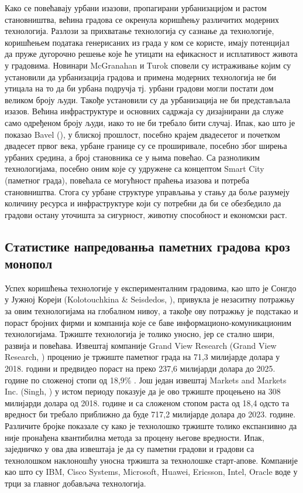 \documentclass{article}
\begin{document}
Како се повећавају урбани изазови, пропагирани урбанизацијом и растом становништва, већина градова се окренула коришћењу различитих модерних технологија. Разлози за прихватање технологија су сазнање да технологије, коришћењем података генерисаних из града у ком се користе, имају потенцијал да пруже дугорочно решење које ће утицати на ефикасност и исплативост живота у градовима. Новинари McGranahan и Тurok \cite{2013} сповели су истраживање којим су установили да урбанизација градова и примена модерних технологија не би утицала на то да би урбана подручја тј. урбани градови могли постати дом великом броју људи. Такође установили су да урбанизација не би представљала изазов. Већина инфраструктуре и основних садржаја су дизајнирани да служе само одређеном броју људи, иако то не би требало бити случај. Ипак, као што је показао Bavel (\cite{b_2013}), у блиској прошлост, посебно крајем двадесетог и почетком двадесет првог века, урбане границе су се проширивале, посебно због ширења урбаних средина, а број становника се у њима повећао. Са разноликим технологијама, посебно оним које су удружене са концептом Smart City (паметног града), повећала се могућност праћења изазова и потреба становништва. Стога су урбане структуре управљања у стању да боље разумеју количину ресурса и инфраструктуре који су потребни да би се обезбедило да градови остану уточишта за сигурност, животну способност и економски раст.

\subsection{Статистике напредованња паметних градова кроз монопол}
Успех коришћења технологије у експерименталним градовима, као што је Сонгдо у Јужној Кореји (Kolotouchkina & Seisdedos, \cite{2017}), привукла је незаситну потражњу за овим технологијама на глобалном нивоу, а такође ову потражњу је подстакао и пораст бројних фирми и компанија које се баве информационо-комуникационим технологијама. Тржиште технологија је толико уносно,  јер се стално шири, развија и повећава. Извештај компаније Grand View Research (Grand View Research, \cite{2019}) проценио је тржиште паметног града на 71,3 милијарде долара у 2018. години и предвидео пораст на преко 237,6 милијарди долара до 2025. године по сложеној стопи од 18,9\% . Још један извештај Markets and Markets Inc. (Singh, \cite{s2019}) у истом периоду показује да је ово тржиште процењено на 308 милијарди долара од 2018. године и са сложеном стопом раста од 18,4 одсто та вредност би требало приближно да буде 717,2 милијарде долара до 2023. године. Различите бројке показале су како је технолошко тржиште толико експанзивно да није пронађена квантибилна метода за процену његове вредности. Ипак, заједничко у ова два извештаја је да су паметни градови и градови са технолошком наклоношћу уносна тржишта за технолошке старт-апове. Компаније као што су IBM, Cisco Systems, Microsoft, Huawei, Ericsson, Intel, Oracle воде у трци за главног добављача технологија. 
\end{document}
